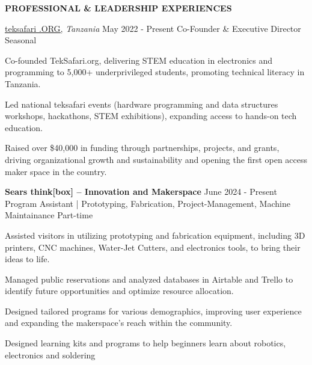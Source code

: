 \begin{rSection}
{\small \normalfont \textbf{ PROFESSIONAL \& LEADERSHIP EXPERIENCES}}
\begin{rSubsection}
{\href {https://teksafari.org}{teksafari .ORG,} {\slshape Tanzania}}
{May 2022 - Present}
{Co-Founder \& Executive Director}
{Seasonal}
    \item Co-founded TekSafari.org, delivering STEM education in electronics and programming to 5,000+ underprivileged students, promoting technical literacy in Tanzania.
    \item Led national teksafari events (hardware programming and data structures workshops, hackathons, STEM exhibitions), expanding access to hands-on tech education.
    \item Raised over \$40,000 in funding through partnerships, projects, and grants, driving organizational growth and sustainability and opening the first open access maker space in the country.
\end{rSubsection}


\begin{rSubsection}
    {\bf Sears think[box] – Innovation and Makerspace}
    {\ttfamily June 2024 - Present}
    {Program Assistant {\normalfont \small \ttfamily | Prototyping, Fabrication, Project-Management, Machine Maintainance} }
    {Part-time}
    \item Assisted visitors in utilizing prototyping and fabrication equipment, including 3D printers, CNC machines, Water-Jet Cutters, and electronics tools, to bring their ideas to life.
    \item Managed public reservations and analyzed databases in Airtable and Trello to identify future opportunities and optimize resource allocation.
    \item Designed tailored programs for various demographics, improving user experience and expanding the makerspace’s reach within the community.
    \item Designed learning kits and programs to help beginners learn about robotics, electronics and soldering
\end{rSubsection}

    
\end{rSection}
